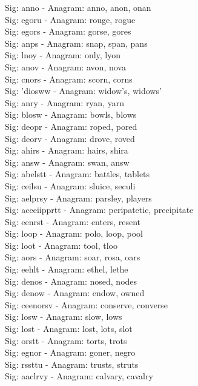 Sig: {anno} - Anagram: anno, anon, onan \\
Sig: {egoru} - Anagram: rouge, rogue \\
Sig: {egors} - Anagram: gorse, gores \\
Sig: {anps} - Anagram: snap, span, pans \\
Sig: {lnoy} - Anagram: only, lyon \\
Sig: {anov} - Anagram: avon, nova \\
Sig: {cnors} - Anagram: scorn, corns \\
Sig: {'diosww} - Anagram: widow's, widows' \\
Sig: {anry} - Anagram: ryan, yarn \\
Sig: {blosw} - Anagram: bowls, blows \\
Sig: {deopr} - Anagram: roped, pored \\
Sig: {deorv} - Anagram: drove, roved \\
Sig: {ahirs} - Anagram: hairs, shira \\
Sig: {answ} - Anagram: swan, answ \\
Sig: {abelstt} - Anagram: battles, tablets \\
Sig: {ceilsu} - Anagram: sluice, seculi \\
Sig: {aelprsy} - Anagram: parsley, players \\
Sig: {aceeiipprtt} - Anagram: peripatetic, precipitate \\
Sig: {eenrst} - Anagram: enters, resent \\
Sig: {loop} - Anagram: polo, loop, pool \\
Sig: {loot} - Anagram: tool, tloo \\
Sig: {aors} - Anagram: soar, rosa, oars \\
Sig: {eehlt} - Anagram: ethel, lethe \\
Sig: {denos} - Anagram: nosed, nodes \\
Sig: {denow} - Anagram: endow, owned \\
Sig: {ceenorsv} - Anagram: conserve, converse \\
Sig: {losw} - Anagram: slow, lows \\
Sig: {lost} - Anagram: lost, lots, slot \\
Sig: {orstt} - Anagram: torts, trots \\
Sig: {egnor} - Anagram: goner, negro \\
Sig: {rssttu} - Anagram: trusts, struts \\
Sig: {aaclrvy} - Anagram: calvary, cavalry \\
